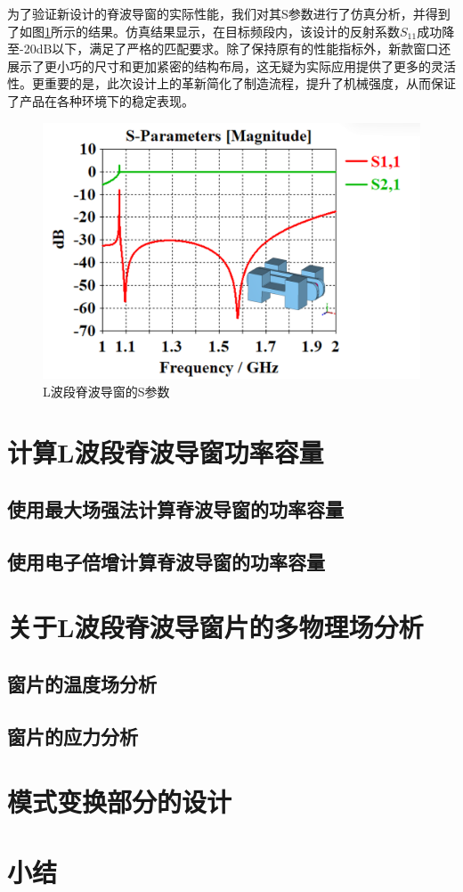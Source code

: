 \documentclass[master]{thesis-uestc}
\begin{document}
为了验证新设计的脊波导窗的实际性能，我们对其S参数进行了仿真分析，并得到了如图\ref{fig:L波段脊波导窗的S参数}所示的结果。仿真结果显示，在目标频段内，该设计的反射系数$S_{11}$成功降至-20dB以下，满足了严格的匹配要求。除了保持原有的性能指标外，新款窗口还展示了更小巧的尺寸和更加紧密的结构布局，这无疑为实际应用提供了更多的灵活性。更重要的是，此次设计上的革新简化了制造流程，提升了机械强度，从而保证了产品在各种环境下的稳定表现。

\begin{figure}[!htb]
    \centering
    \includegraphics[width=0.45\linewidth]{pic/chapter4/L波段脊波导窗S参数.png}
    \caption{L波段脊波导窗的S参数}
    \label{fig:L波段脊波导窗的S参数}
\end{figure}
\section{计算L波段脊波导窗功率容量}
\subsection{使用最大场强法计算脊波导窗的功率容量}
\subsection{使用电子倍增计算脊波导窗的功率容量}
\section{关于L波段脊波导窗片的多物理场分析}
\subsection{窗片的温度场分析}
\subsection{窗片的应力分析}
\section{模式变换部分的设计}
\section{小结}
\end{document}
